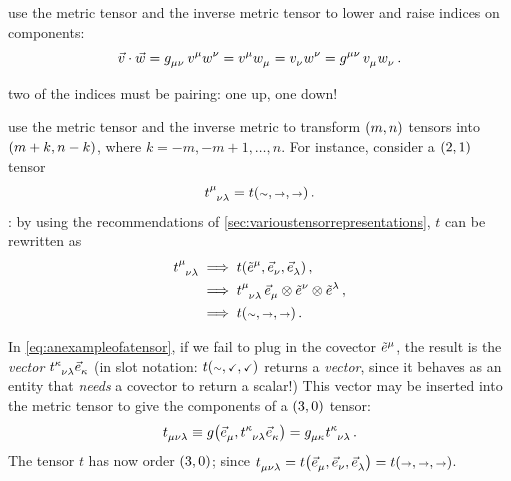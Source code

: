  use the metric tensor and the inverse metric tensor to lower and raise indices on components:
%
\begin{equation}\label{eq:loweringrisingindices}
  \vec v\iprod\vec w = \tmetric\mu\nu\,\tvec v\mu\tvec w\nu
                     = \tvec v\mu\tcov w\mu
                     = \tcov v\nu\tvec w\nu
                     = \tinvmet\mu\nu\,\tcov v\mu\tcov w\nu\,.
\end{equation}

 two of the indices must be pairing: one up, one down!

 use the metric tensor and the inverse metric to transform $\torder mn$ tensors into $\torder{m + k}{n - k}$, where $k = -m, -m+1, \dotsc, n$. For instance, consider a $\torder 21$ tensor 
%
\begin{equation}\label{eq:anexampleofatensor}
  \tensor{t}{^\mu_\nu_\lambda} = t\vat{\cslot,\vslot,\vslot}\,.
\end{equation}
%
: by using the recommendations of \cref{sec:varioustensorrepresentations}, $t$ can be rewritten as
%
\begin{align*}
  \tensor{t}{^\mu_\nu_\lambda} &\implies t\vat{\tbcov\mu,\tbvec\nu,\tbvec\lambda} \,,\\
                               &\implies \tensor{t}{^\mu_\nu_\lambda}\,\tbvec\mu\tprod\tbcov\nu\tprod\tbcov\lambda\,,\\
                               &\implies t\vat{\cslot,\vslot,\vslot}\,.
\end{align*}

In \cref{eq:anexampleofatensor}, if we fail to plug in the covector $\tbcov\mu$, the result is the \emph{vector} $\tensor{t}{^\kappa_\nu_\lambda}\tbvec\kappa$ (in slot notation: $t\vat{\cslot,\fslot,\fslot}$ returns a \emph{vector}, since it behaves as an entity that \emph{needs} a covector to return a scalar!) This vector may be inserted into the metric tensor to give the components of a $\torder 30$ tensor:
%
\begin{equation}\label{eq:exampleofmetrictransformationofatensor}
  \tensor{t}{_\mu_\nu_\lambda} \defas \metric\vat{\tbvec\mu, \tensor{t}{^\kappa_\nu_\lambda}\tbvec\kappa}
                               = \tmetric\mu\kappa\tensor{t}{^\kappa_\nu_\lambda}\,.
\end{equation}
%
The tensor $t$ has now order $\torder 30$; since $\tensor{t}{_\mu_\nu_\lambda} = t\vat{\tbvec\mu,\tbvec\nu,\tbvec\lambda} = t\vat{\vslot,\vslot,\vslot}$.

